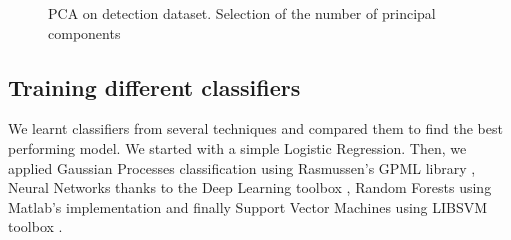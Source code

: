 \documentclass{article}
\begin{document}
   \begin{figure}[ht]
       \center
    	\hfill
	\caption{PCA on detection dataset. Selection of the number of principal components}
  \end{figure}

  \subsection{Training different classifiers}
  We learnt classifiers from several techniques and compared them to find the best performing model. We started with a simple Logistic Regression. Then, we applied Gaussian Processes classification using Rasmussen's GPML library \cite{gpmltoolbox},  Neural Networks thanks to the Deep Learning toolbox \cite{deeplearningtoolbox}, Random Forests using Matlab's implementation and finally Support Vector Machines using LIBSVM toolbox \cite{libsvmtoolbox}.\\
\end{document}
